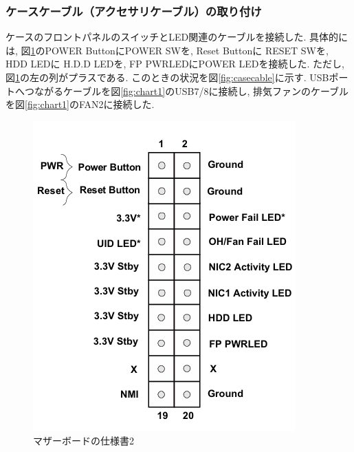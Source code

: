 \documentclass{ltjsarticle} %
\begin{document}
\subsubsection{ケースケーブル（アクセサリケーブル）の取り付け}

ケースのフロントパネルのスイッチとLED関連のケーブルを接続した.
具体的には, 図\ref{fig:chart2}のPOWER ButtonにPOWER SWを, 
Reset Buttonに RESET SWを,  HDD LEDに H.D.D LEDを, 
FP PWRLEDにPOWER LEDを接続した. ただし, 図\ref{fig:chart2}の左の列がプラスである.
このときの状況を図\ref{fig:casecable}に示す.
USBポートへつながるケーブルを図\ref{fig:chart1}のUSB7/8に接続し, 
排気ファンのケーブルを図\ref{fig:chart1}のFAN2に接続した. 

\begin{figure}[H] %
  \centering
  \begin{minipage}{0.45\textwidth} %
    \centering
    \includegraphics[width=\textwidth]{chart2.png} %
    \caption{マザーボードの仕様書2} %
    \label{fig:chart2} %
  \end{minipage}

\end{figure}
\end{document}
